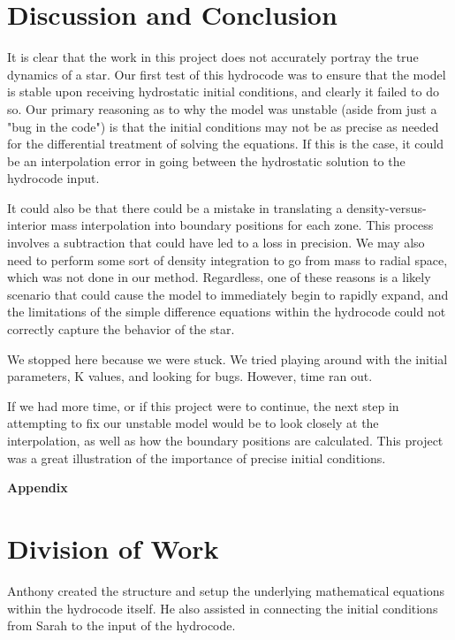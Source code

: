 \documentclass[12pt]{article}
\begin{document}
\section{Discussion and Conclusion}

It is clear that the work in this project does not accurately portray the true dynamics of
a star. Our first test of this hydrocode was to ensure that the model is stable upon receiving
hydrostatic initial conditions, and clearly it failed to do so. Our primary reasoning as to why
the model was unstable (aside from just a "bug in the code") is that the initial conditions
may not be as precise as needed for the differential treatment of solving the equations.
If this is the case, it could be an interpolation error in going between the hydrostatic solution
to the hydrocode input.

It could also be that there could be a mistake in translating a
density-versus-interior mass interpolation into boundary positions for each zone. This process
involves a subtraction that could have led to a loss in precision. We may also need to
perform some sort of density integration to go from mass to radial space, which was not
done in our method. Regardless, one of these
reasons is a likely scenario that could cause the model to immediately begin to rapidly
expand, and the limitations of the simple difference equations within the hydrocode could
not correctly capture the behavior of the star.

We stopped here because we were stuck. We tried playing around with the initial parameters, K values, and looking for bugs. However, time ran out.

If we had more time, or if this project were to continue, the next step in attempting to fix
our unstable model would be to look closely at the interpolation, as well as how the boundary
positions are calculated. This project was a great illustration of the importance
of precise initial conditions.




\appendix
\begin{center}\begin{LARGE}
\textbf{Appendix}
\end{LARGE}\end{center}


\section{Division of Work}

Anthony created the structure and setup the underlying mathematical equations within the hydrocode
itself. He also assisted in connecting the initial conditions from Sarah to the input of
the hydrocode.
\end{document}
